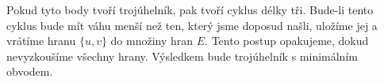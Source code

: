 Pokud tyto body tvoří trojúhelník, pak tvoří cyklus délky tři. Bude-li tento cyklus bude mít váhu menší než ten, který jsme doposud našli, uložíme jej a vrátíme hranu $\{u, v\}$ do množiny hran $E$. Tento postup opakujeme, dokud nevyzkoušíme všechny hrany. Výsledkem bude trojúhelník s minimálním obvodem.


        
